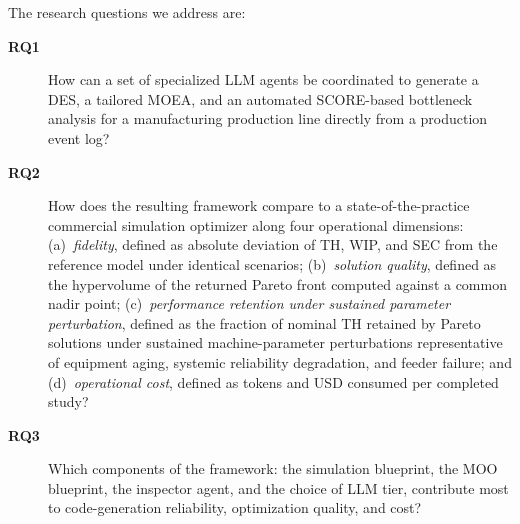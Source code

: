 \documentclass[a4paper,fleqn]{cas-sc}
\begin{document}
The research questions we address are:
\begin{description}

  \item[\textbf{RQ1}] How can a set of specialized LLM agents be coordinated to generate a DES, a tailored MOEA, and an  automated SCORE-based bottleneck analysis for a manufacturing production line directly from a production event log?  %
  
    \item[\textbf{RQ2}] How does the resulting framework compare to a state-of-the-practice commercial simulation optimizer along four operational dimensions: (a)~\emph{fidelity}, defined as absolute deviation of TH, WIP, and SEC from the reference model under identical scenarios; (b)~\emph{solution quality}, defined as the hypervolume of the returned Pareto front computed against a common nadir point;  (c)~\emph{performance retention under sustained parameter perturbation}, defined as the fraction of nominal TH retained by Pareto solutions under sustained machine-parameter perturbations representative of equipment aging, systemic reliability degradation, and feeder failure; and (d)~\emph{operational cost}, defined as tokens and USD consumed per completed study?                                                                         
    \item[\textbf{RQ3}] Which components of the framework: the simulation blueprint, the MOO blueprint, the inspector agent, and the choice of LLM tier, contribute most to code-generation reliability, optimization quality, and cost?                                                  
  \end{description}  
\end{document}
